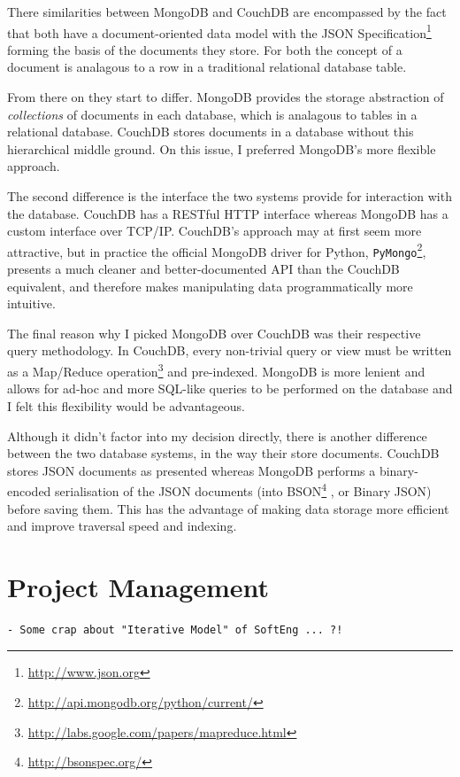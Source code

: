 \documentclass[a4paper,12pt,twoside,notitlepage]{report}
\begin{document}
There similarities between MongoDB and CouchDB are encompassed by the fact that
both have a document-oriented data model with the JSON
Specification\footnote{\url{http://www.json.org}} forming the basis of the
documents they store. For both the concept of a document is analagous to a row
in a traditional relational database table. 

From there on they start to differ. MongoDB provides the storage abstraction of
\emph{collections} of documents in each database, which is analagous to tables
in a relational database. CouchDB stores documents in a database without
this hierarchical middle ground. On this issue, I preferred MongoDB's more
flexible approach.

The second difference is the interface the two systems provide for interaction
with the database. CouchDB has a RESTful HTTP interface whereas MongoDB has a
custom interface over TCP/IP. CouchDB's approach may at first seem more
attractive, but in practice the official MongoDB driver for Python,
\texttt{PyMongo}\footnote{\url{http://api.mongodb.org/python/current/}},
presents a much cleaner and better-documented API than the CouchDB equivalent,
and therefore makes manipulating data programmatically more intuitive.

The final reason why I picked MongoDB over CouchDB was their respective query
methodology. In CouchDB, every non-trivial query or view must be written as a
Map/Reduce
operation\footnote{\url{http://labs.google.com/papers/mapreduce.html}} and
pre-indexed. MongoDB is more lenient and allows for ad-hoc and more SQL-like
queries to be performed on the database and I felt this flexibility would be
advantageous.

Although it didn't factor into my decision directly, there is another
difference between the two database systems, in the way their store documents.
CouchDB stores JSON documents as presented whereas MongoDB performs a
binary-encoded serialisation of the JSON documents (into
BSON\footnote{\url{http://bsonspec.org/}} , or Binary JSON) before saving them.
This has the advantage of making data storage more efficient and improve
traversal speed and indexing.

\section{Project Management}

\begin{verbatim}
- Some crap about "Iterative Model" of SoftEng ... ?!
\end{verbatim}
\end{document}
